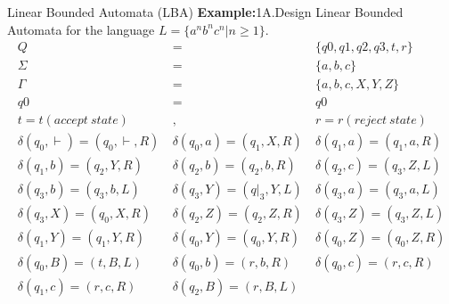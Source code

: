 \documentclass{beamer}
\begin{document}
\begin{frame}{Linear Bounded Automata (LBA)}
	\textbf{Example:}1A.Design Linear Bounded Automata for the language $L = \{ a^n b^ n c^ n | n\geq1 \}$.
	\begin{eqnarray*}
		Q &=& \{q0, q1, q2, q3, t,r\}\\
		\Sigma &=& \{a, b, c\}\\
		\Gamma &=& \{a, b, c, X,Y,Z\}
		\\
		q0 &=& q0\\
		t = t (accept\  state) &,&
		r = r (reject\  state)\\
		\delta(q_0, \vdash) = (q_0, \vdash, R)\ & \delta(q_0, a) = (q_1, X,R )\ & \delta(q_1, a) = (q_1, a, R) \\
		\delta(q_1, b) = (q_2, Y, R )\ &  \delta(q_2, b) = (q_2, b, R)\ & \delta(q_2,c) = (q_3, Z, L) \\
		\delta(q_3, b) = (q_3, b, L)\ & \delta(q_3, Y) = (q|_3, Y, L)\ & \delta(q_3, a) = (q_3, a, L) \\
		\delta(q_3, X) = (q_0, X, R)\ & \delta(q_2, Z) = (q_2, Z, R)\ & \delta(q_3, Z) = (q_3, Z, L) \\
		\delta(q_1, Y) = (q_1, Y, R)\ & \delta(q_0, Y) = (q_0, Y, R)\ & \delta(q_0, Z) = (q_0, Z, R)  \\
		\delta(q_0, B) = (t, B, L)\ & \delta(q_0, b) = (r, b, R)\ & \delta(q_0, c) = (r, c, R)  \\
		\delta(q_1, c) = (r, c, R)\ & \delta(q_2, B) = (r, B, L)
	\end{eqnarray*}
\end{frame}
\end{document}
